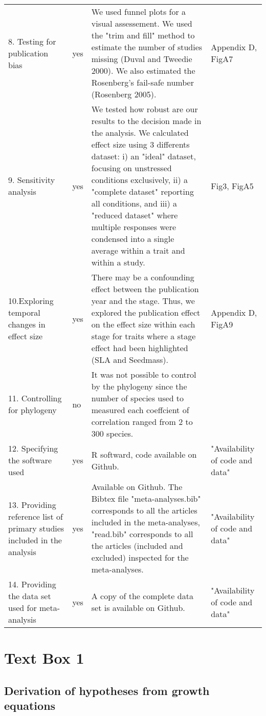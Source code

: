 \documentclass[a4paper]{article}\usepackage[]{graphicx}\usepackage[]{color}
\begin{document}
\begin{table}[h!]
\begin{tabular}{p{3cm} p{1cm} p{10cm} p{3cm}}
  8. Testing for publication bias &	yes	& We used funnel plots for a visual assessement. We used the "trim and fill" method to estimate the number of studies missing (Duval and Tweedie 2000). We also estimated the Rosenberg’s fail-safe number (Rosenberg 2005). 	&  Appendix D, FigA7\\
  9. Sensitivity analysis &	yes &	We tested how robust are our results to the decision made in the analysis. We calculated effect size using 3 differents dataset: i) an  "ideal" dataset, focusing on unstressed conditions exclusively, ii) a "complete dataset" reporting all conditions, and iii) a "reduced dataset" where multiple responses were condensed into a single average within a trait and within a study. &	Fig3, FigA5 \\
  10.Exploring temporal changes in effect size &	yes	& There may be a confounding effect between the publication year and the stage. Thus, we explored the publication effect on the effect size within each stage for traits where a stage effect had been highlighted (SLA and Seedmass). & Appendix D, FigA9 \\
  11. Controlling for phylogeny &	no &	It was not possible to control by the phylogeny since the number of species used to measured each coeffcient of correlation ranged from 2 to 300 species. &	\\
  12. Specifying the software used &	yes	& R softward, code available on Github. & "Availability of code and data" \\
 13. Providing reference list of primary studies included in the analysis &	yes &	Available on Github. The Bibtex file "meta-analyses.bib" corresponds to all the articles included in the meta-analyses, "read.bib" corresponds to all the articles (included and excluded) inspected for the meta-analyses.	& "Availability of code and data" \\
  14. Providing the data set used for meta-analysis  &	yes &	A copy of the complete data set is available on Github.	& "Availability of code and data" \\
   \hline
\end{tabular}
\end{table}


\clearpage
\section*{Text Box 1} \label{sec:growth}

\subsection*{Derivation of hypotheses from growth equations} 
\end{document}
